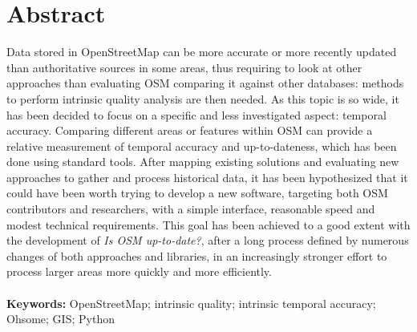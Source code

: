 \documentclass{Configuration_Files/PoliMi3i_thesis}
\begin{document}
\chapter*{Abstract}

Data stored in OpenStreetMap can be more accurate or more recently updated than authoritative sources in some areas, thus requiring to look at other approaches than evaluating OSM comparing it against other databases: methods to perform intrinsic quality analysis are then needed. As this topic is so wide, it has been decided to focus on a specific and less investigated aspect: temporal accuracy.
Comparing different areas or features within OSM can provide a relative measurement of temporal accuracy and up-to-dateness, which has been done using standard tools. After mapping existing solutions and evaluating new approaches to gather and process historical data, it has been hypothesized that it could have been worth trying to develop a new software, targeting both OSM contributors and researchers, with a simple interface, reasonable speed and modest technical requirements. This goal has been achieved to a good extent with the development of \textit{Is OSM up-to-date?}, after a long process defined by numerous changes of both approaches and libraries, in an increasingly stronger effort to process larger areas more quickly and more efficiently.
\\
\\
\textbf{Keywords:} OpenStreetMap; intrinsic quality; intrinsic temporal accuracy; Ohsome; GIS; Python
\end{document}

